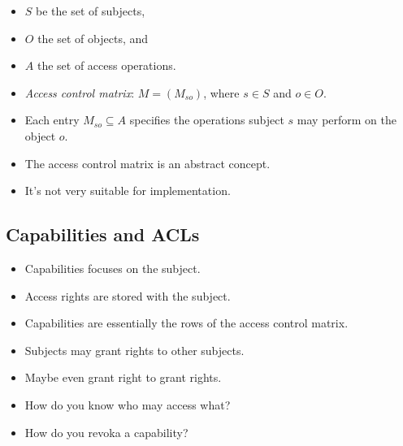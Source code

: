 \begin{frame}
  \begin{definition}
    \begin{itemize}
      \item \(S\) be the set of subjects,
      \item \(O\) the set of objects, and
      \item \(A\) the set of access operations.

        \pause{}

      \item \emph{Access control matrix}: \( M = \left( M_{so} \right)\), where 
        \(s\in S\) and \(o\in O\).
      \item Each entry \(M_{so}\subseteq A\) specifies the operations subject 
        \(s\) may perform on the object \(o\).
    \end{itemize}
  \end{definition}
\end{frame}

\begin{frame}
  \begin{remark}
    \begin{itemize}
      \item The access control matrix is an abstract concept.
      \item It's not very suitable for implementation.
    \end{itemize}
  \end{remark}
\end{frame}

\subsection{Capabilities and ACLs}

\begin{frame}
  \begin{itemize}
    \item Capabilities focuses on the subject.
    \item Access rights are stored with the subject.
    \item Capabilities are essentially the rows of the access control matrix.
    \item Subjects may grant rights to other subjects.
    \item Maybe even grant right to grant rights.

    \item How do you know who may access what?
    \item How do you revoka a capability?
  \end{itemize}
\end{frame}

